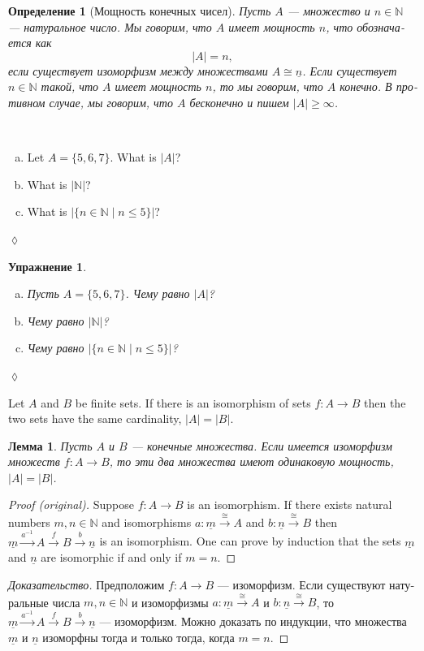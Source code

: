 \documentclass[a4paper]{book}
\def\NN{{\mathbb N}}
\def\to{\rightarrow}
\def\taking{\colon}
\def\iso{\cong}
\def\|{{\;|\;}}
\def\m1{{-1}}
\def\ul{\underline}
\newcommand{\To}[1]{\xrightarrow{#1}}
\theoremstyle{myth}
\newtheorem{lemmaENG}[envENG]{\begin{english}Lemma\end{english}}
\newtheorem{excENG}[envENG]{\begin{english}Exercise\end{english}}
\newenvironment{proofENG}{\begin{proof}[Proof (original)]}{\end{proof}}
\newenvironment{exerciseENG}{\begin{excENG}}{\hspace*{\fill}$\lozenge$\end{excENG}}
\newtheorem{lemmaRUS}[envRUS]{Лемма}
\newtheorem{excRUS}[envRUS]{Упражнение}
\newtheorem{definitionRUS}[envRUS]{Определение}
\newenvironment{proofRUS}{\begin{proof}[Доказательство]}{\end{proof}}
\newenvironment{exerciseRUS}{\begin{excRUS}}{\hspace*{\fill}$\lozenge$\end{excRUS}}
\def\sexc{\begin{enumerate}[a.)]\setlength{\itemsep}{.1cm}\setlength{\parskip}{.1cm}\item}
\def\next{\item}
\def\endsexc{\end{enumerate}}
\begin{document}
\begin{russian}
\begin{definitionRUS}[Мощность конечных чисел]\label{def:cardinality}
Пусть $A$ — множество и $n\in\NN$ — натуральное число. Мы говорим, что $A$ {\em имеет мощность $n$}, что обозначается как $$|A|=n,$$ если существует изоморфизм между множествами $A\iso\ul{n}$. Если существует $n\in\NN$ такой, что $A$ имеет мощность $n$, то мы говорим, что $A$ {\em конечно}. В противном случае, мы говорим, что $A$ {\em бесконечно} и пишем $|A|\geq\infty$.
\end{definitionRUS}

\begin{exerciseENG}~
\sexc Let $A=\{5,6,7\}$. What is $|A|$? 
\next What is $|\NN|$? 
\next What is $|\{n\in\NN\|n\leq 5\}|$?
\endsexc
\end{exerciseENG}

\begin{exerciseRUS}~
\sexc Пусть $A=\{5,6,7\}$. Чему равно $|A|$? 
\next Чему равно $|\NN|$? 
\next Чему равно $|\{n\in\NN\|n\leq 5\}|$?
\endsexc
\end{exerciseRUS}

\begin{lemmaENG}
Let $A$ and $B$ be finite sets. If there is an isomorphism of sets $f\taking A\to B$ then the two sets have the same cardinality, $|A|=|B|$.
\end{lemmaENG}

\begin{lemmaRUS}
Пусть $A$ и $B$ — конечные множества. Если имеется изоморфизм множеств $f\taking A\to B$, то эти два множества имеют одинаковую мощность, $|A|=|B|$. 
\end{lemmaRUS}

\begin{proofENG}
Suppose $f\taking A\to B$ is an isomorphism. If there exists natural numbers $m,n\in\NN$ and isomorphisms $a\taking\ul{m}\To\iso A$ and $b\taking\ul{n}\To\iso B$ then $\ul{m}\To{a^\m1}A\To{f}B\To{b}\ul{n}$ is an isomorphism. One can prove by induction that the sets $\ul{m}$ and $\ul{n}$ are isomorphic if and only if $m=n$. 
\end{proofENG}

\begin{proofRUS}
Предположим $f\taking A\to B$ — изоморфизм. Если существуют натуральные числа $m,n\in\NN$ и изоморфизмы $a\taking\ul{m}\To\iso A$ и $b\taking\ul{n}\To\iso B$, то $\ul{m}\To{a^\m1}A\To{f}B\To{b}\ul{n}$ — изоморфизм. Можно доказать по индукции, что множества $\ul{m}$ и $\ul{n}$ изоморфны тогда и только тогда, когда $m=n$. 
\end{proofRUS}


\end{russian}
\end{document}

